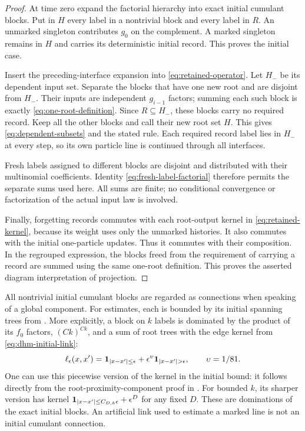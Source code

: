 \begin{proof}
At time zero expand the factorial hierarchy into exact initial cumulant
blocks.  Put in $H$ every label in a nontrivial block and every label in
$R$.  An unmarked singleton contributes $g_0$ on the complement.  A
marked singleton remains in $H$ and carries its deterministic initial
record.  This proves the initial case.

Insert the preceding-interface expansion into
\eqref{eq:retained-operator}.  Let $H_-$ be its dependent input set.
Separate the blocks that have one new root and are disjoint from $H_-$.
Their inputs are independent $g_{i-1}$ factors; summing each such block
is exactly \eqref{eq:one-root-definition}.  Since $R\subseteq H_-$, these
blocks carry no required record.  Keep all the other blocks and call
their new root set $H$.  This gives \eqref{eq:dependent-subsets} and the
stated rule.  Each required record label lies in $H_-$ at every step,
so its own particle line is continued through all interfaces.

Fresh labels assigned to different blocks are disjoint and distributed
with their multinomial coefficients.  Identity
\eqref{eq:fresh-label-factorial} therefore permits the separate sums
used here.  All sums are finite; no conditional convergence or
factorization of the actual input law is involved.

Finally, forgetting records commutes with each root-output kernel in
\eqref{eq:retained-kernel}, because its weight uses only the unmarked
histories.  It also commutes with the initial one-particle updates.
Thus it commutes with their composition.  In the regrouped expression,
the blocks freed from the requirement of carrying a record are summed
using the same one-root definition.  This proves the asserted diagram
interpretation of projection.
\end{proof}

All nontrivial initial cumulant blocks are regarded as connections when
speaking of a global component.  For estimates, each is bounded by its
initial spanning trees from .  More explicitly, a
block on $k$ labels is dominated by the product of its $f_0$ factors,
$(Ck)^{Ck}$, and a sum of root trees with the edge kernel from
\eqref{eq:dhm-initial-link}:
\begin{equation}\label{eq:initial-kernel-expansion}
 \ell_\eps(x,x')=\ind_{|x-x'|\le\eps}
                    +\eps^{\upsilon}\ind_{|x-x'|>\eps},
 \qquad \upsilon=1/81.
\end{equation}
One can use this piecewise version of the kernel in the initial bound:
it follows directly from the root-proximity-component proof in
.  For bounded $k$, its sharper version has kernel
$\mathbf 1_{|x-x'|\le C_{D,k}\epsilon}+\epsilon^D$ for any fixed $D$.
These are dominations of the exact initial blocks.  An artificial link
used to estimate a marked line is not an initial cumulant connection.

